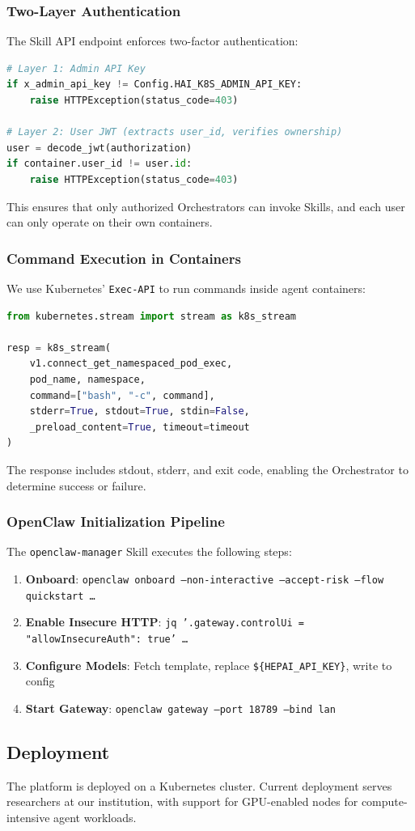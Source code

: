 \subsubsection{Two-Layer Authentication}
The Skill API endpoint enforces two-factor authentication:

\begin{lstlisting}[language=Python]
# Layer 1: Admin API Key
if x_admin_api_key != Config.HAI_K8S_ADMIN_API_KEY:
    raise HTTPException(status_code=403)

# Layer 2: User JWT (extracts user_id, verifies ownership)
user = decode_jwt(authorization)
if container.user_id != user.id:
    raise HTTPException(status_code=403)
\end{lstlisting}

This ensures that only authorized Orchestrators can invoke Skills, and each user can only operate on their own containers.

\subsubsection{Command Execution in Containers}
We use Kubernetes' \texttt{Exec-API} to run commands inside agent containers:

\begin{lstlisting}[language=Python]
from kubernetes.stream import stream as k8s_stream

resp = k8s_stream(
    v1.connect_get_namespaced_pod_exec,
    pod_name, namespace,
    command=["bash", "-c", command],
    stderr=True, stdout=True, stdin=False,
    _preload_content=True, timeout=timeout
)
\end{lstlisting}

The response includes stdout, stderr, and exit code, enabling the Orchestrator to determine success or failure.

\subsubsection{OpenClaw Initialization Pipeline}
The \texttt{openclaw-manager} Skill executes the following steps:

\begin{enumerate}
    \item \textbf{Onboard}: \texttt{openclaw onboard --non-interactive --accept-risk --flow quickstart \ldots}
    \item \textbf{Enable Insecure HTTP}: \texttt{jq '.gateway.controlUi = {"allowInsecureAuth": true}' \ldots}
    \item \textbf{Configure Models}: Fetch template, replace \texttt{\$\{HEPAI\_API\_KEY\}}, write to config
    \item \textbf{Start Gateway}: \texttt{openclaw gateway --port 18789 --bind lan}
\end{enumerate}

\subsection{Deployment}
The platform is deployed on a Kubernetes cluster. Current deployment serves researchers at our institution, with support for GPU-enabled nodes for compute-intensive agent workloads.
